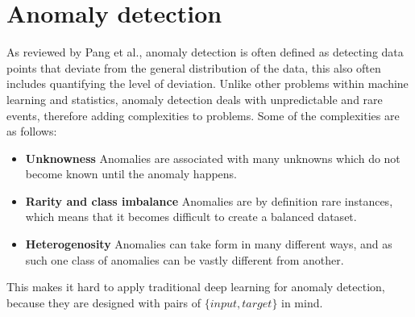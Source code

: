 \section{Anomaly detection}
As reviewed by Pang et al.\cite{anomaly_detection}, anomaly detection is often defined as detecting data points that deviate from the general distribution of the data, this also often includes quantifying the level of deviation. Unlike other problems within machine learning and statistics, anomaly detection deals with unpredictable and rare events, therefore adding complexities to problems. Some of the complexities are as follows:
\begin{itemize}
    \item \textbf{Unknowness} Anomalies are associated with many unknowns which do not become known until the anomaly happens.
    \item \textbf{Rarity and class imbalance} Anomalies are by definition rare instances, which means that it becomes difficult to create a balanced dataset.
    \item \textbf{Heterogenosity} Anomalies can take form in many different ways, and as such one class of anomalies can be vastly different from another.
\end{itemize}
This makes it hard to apply traditional deep learning for anomaly detection, because they are designed with pairs of $\{input, target\}$ in mind.
